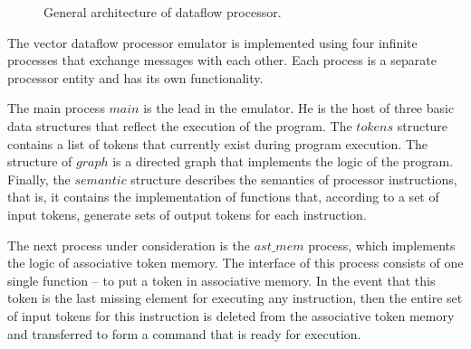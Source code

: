 \documentclass[
11pt,%
tightenlines,%
twoside,%
onecolumn,%
nofloats,%
nobibnotes,%
nofootinbib,%
superscriptaddress,%
noshowpacs,%
centertags]%
{revtex4}
\begin{document}
\begin{figure}[h!]
\setcaptionmargin{5mm}
\onelinecaptionsfalse
{}
\caption{General architecture of dataflow processor.}
\label{fig:big-scheme}
\end{figure}

The vector dataflow processor emulator is implemented using four infinite processes that exchange messages with each other.
Each process is a separate processor entity and has its own functionality.

The main process $main$ is the lead in the emulator.
He is the host of three basic data structures that reflect the execution of the program.
The $tokens$ structure contains a list of tokens that currently exist during program execution.
The structure of $graph$ is a directed graph that implements the logic of the program.
Finally, the $semantic$ structure describes the semantics of processor instructions, that is, it contains the implementation of functions that, according to a set of input tokens, generate sets of output tokens for each instruction.

The next process under consideration is the $ast\_mem$ process, which implements the logic of associative token memory.
The interface of this process consists of one single function -- to put a token in associative memory.
In the event that this token is the last missing element for executing any instruction, then the entire set of input tokens for this instruction is deleted from the associative token memory and transferred to form a command that is ready for execution.
\end{document}

